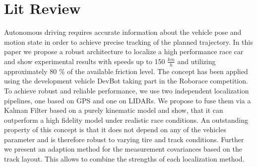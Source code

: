 \chapter{Lit Review}



Autonomous driving requires accurate information about the vehicle pose and motion state in order to achieve precise tracking of the planned trajectory. In this paper we propose a robust architecture to localize a high performance race car and show experimental results with speeds up to 150 $\frac{km}{h}$ and utilizing approximately 
80 $\%$ of the available friction level. The concept has been applied using the development vehicle DevBot taking part in the Roborace competition. To achieve robust and reliable performance, we use two independent localization pipelines, one based on GPS and one on LIDARs. We propose to fuse them via a Kalman Filter based on a purely kinematic model and show, that it can outperform a high fidelity model under realistic race conditions. An outstanding property of this concept is that it does not depend on any of the vehicles parameter and is therefore robust to varying tire and track conditions. Further we present an adaption method for the measurement covariances based on the track layout. This allows to combine the strengths of each localization method. \cite{Alex19}